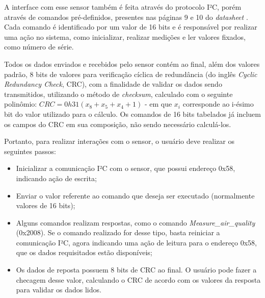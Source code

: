 \documentclass[../monografia.tex]{subfiles}
\begin{document}
A interface com esse sensor também é feita através do protocolo I²C, porém através de comandos pré-definidos, presentes nas páginas 9 e 10 do \textit{datasheet} \cite{sgp30}. Cada comando é identificado por um valor de 16 bits e é responsável por realizar uma ação no sistema, como inicializar, realizar medições e ler valores fixados, como número de série. 

Todos os dados enviados e recebidos pelo sensor contém ao final, além dos valores padrão, 8 bits de valores para verificação cíclica de redundância (do inglês \textit{Cyclic Redundancy Check}, CRC), com a finalidade de validar os dados sendo transmitidos, utilizando o método de \textit{checksum}, calculado com o seguinte polinômio: $CRC = 0h31 (x_{8} + x_{5} + x_{4} + 1)$ - em que $x_{i}$ corresponde ao i-ésimo bit do valor utilizado para o cálculo. Os comandos de 16 bits tabelados já incluem os campos do CRC em sua composição, não sendo necessário calculá-los.

Portanto, para realizar interações com o sensor, o usuário deve realizar os seguintes passos:

\begin{itemize}
	\item Inicializar a comunicação I²C com o sensor, que possui endereço 0x58, indicando ação de escrita;
	\item Enviar o valor referente ao comando que deseja ser executado (normalmente valores de 16 bits);
	\item Alguns comandos realizam respostas, como o comando \textit{Measure\_air\_quality} (0x2008). Se o comando realizado for desse tipo, basta reiniciar a comunicação I²C, agora indicando uma ação de leitura para o endereço 0x58, que os dados requisitados estão disponíveis;
	\item Os dados de reposta possuem 8 bits de CRC ao final. O usuário pode fazer a checagem desse valor, calculando o CRC de acordo com os valores da resposta para validar os dados lidos.
\end{itemize}
\end{document}

